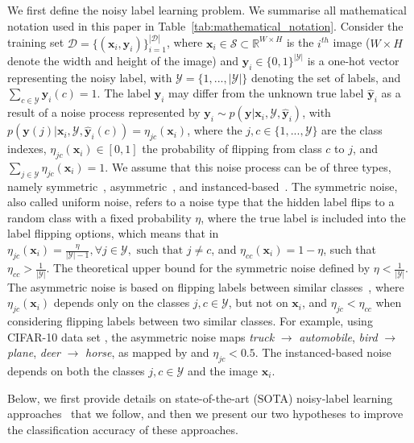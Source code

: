 \documentclass[review]{elsarticle}
\begin{document}
We first define the noisy label learning problem. We summarise all mathematical notation used in this paper in Table~\ref{tab:mathematical_notation}.
Consider the training set $\mathcal{D}=\{(\mathbf{x}_i, \mathbf{y}_i)\}_{i=1}^{|\mathcal{D}|}$, where $\mathbf{x}_i \in \mathcal{S} \subset \mathbb{R}^{W \times H}$ is the $i^{th}$ image ($W \times H$ denote the width and height of the image) and $\mathbf{y}_i \in \{0,1\}^{|\mathcal{Y}|}$ is a one-hot vector representing the noisy label, with $\mathcal{Y} = \{1,...,|\mathcal{Y}|\}$ denoting the set of labels, and $\sum_{c \in \mathcal{Y}} \mathbf{y}_i(c)=1$. 
The label $\mathbf{y}_i$ may differ from the unknown true label $\hat{\mathbf{y}}_i$ as a result of a noise process represented by $\mathbf{y}_i \sim p(\mathbf{y} | \mathbf{x}_i,\mathcal{Y},\hat{\mathbf{y}}_i)$, with $p(\mathbf{y}(j) | \mathbf{x}_i,\mathcal{Y},\hat{\mathbf{y}}_i(c))=\eta_{jc}(\mathbf{x}_i)$,
where the $j,c\in\{1,...,\mathcal{Y}\}$ are the class indexes, $\eta_{jc}(\mathbf{x}_i) \in [0,1]$ the probability of flipping from class $c$ to $j$, and $\sum_{j \in \mathcal{Y}}\eta_{jc}(\mathbf{x}_i)=1$. We assume that this noise process can be of three types, namely symmetric~\cite{kim2019nlnl}, asymmetric~\cite{patrini2017making}, and instanced-based~\cite{rog}.
The symmetric noise, also called uniform noise, refers to a noise type that the hidden label flips to a random class with a fixed probability $\eta$, where the true label is included into the label flipping options, which means that in $\eta_{jc}(\mathbf{x}_i)=\frac{\eta}{|\mathcal{Y}|-1}, \forall j \in \mathcal{Y}, \text{ such that } j \neq c$, and $\eta_{cc}(\mathbf{x}_i)=1-\eta$, such that $\eta_{cc} > \frac{1}{|\mathcal{Y}|}$. The theoretical upper bound for the symmetric noise defined by $\eta < \frac{1}{|\mathcal{Y}|}$. 
The asymmetric noise is based on flipping labels between similar classes~\cite{patrini2017making}, where $\eta_{jc}(\mathbf{x}_i)$ depends only on the classes $j,c\in\mathcal{Y}$, but not on $\mathbf{x}_i$, and $\eta_{jc}<\eta_{cc}$ when considering flipping labels between two similar classes.  For example, using  CIFAR-10 data set \cite{krizhevsky2009learning}, the asymmetric noise maps \emph{truck} $\to$ \emph{automobile}, \emph{bird} $\to$ \emph{plane}, \emph{deer} $\to$ \emph{horse}, as mapped by \cite{zhang2018generalized} and $\eta_{jc}<0.5$. 
The instanced-based noise~\cite{rog} depends on both the classes $j,c\in\mathcal{Y}$ and the image $\mathbf{x}_i$.

Below, we first provide details on state-of-the-art (SOTA) noisy-label learning approaches~\cite{li2020dividemix, ding2018semi, kong2019recycling} that we follow, and then we present our two hypotheses to improve the classification accuracy of these approaches.
\end{document}
